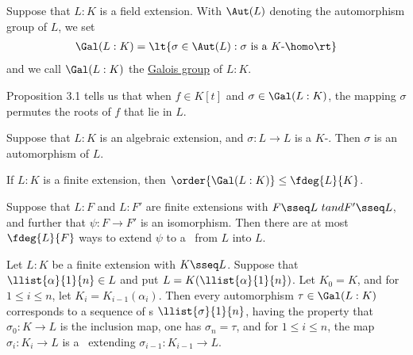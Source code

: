 \documentclass{article}
\begin{document}
  \begin{tdefinition}
    Suppose that \( L:K \) is a field extension.
    With \( \Aut(L) \) denoting the automorphism group of \( L \), we set \begin{align*}
      \Gal(L:K) = \lt\{ \sigma\in \Aut(L) : \sigma \text{ is a \( K \)-\homo} \rt\}
    \end{align*}
    and we call \( \Gal(L:K) \) the \ul{Galois group} of \( L:K \).
  \end{tdefinition}

  \quad Proposition 3.1 tells us that when \( f\in K[t] \) and \( \sigma\in \Gal(L:K) \), the mapping \( \sigma \) permutes the roots of \( f \) that lie in \( L \).

  \begin{ttheorem}
    Suppose that \( L:K \) is an algebraic extension, and \( \sigma:L\to L \) is a \( K \)-\homo.
    Then \( \sigma \) is an automorphism of \( L \).
  \end{ttheorem}

  \begin{ttheorem}
    If \( L:K \) is a finite extension, then \( \order{\Gal(L:K)}\leq \fdeg{L}{K} \).
  \end{ttheorem}

  \begin{tcorollary}
    Suppose that \( L:F \) and \( L:F' \) are finite extensions with \( F\sseq L\ tand F'\sseq L \), and further that \( \psi:F\to F' \) is an isomorphism.
    Then there are at most \( \fdeg{L}{F} \) ways to extend \( \psi \) to a \homo~from \( L \) into \( L \).
  \end{tcorollary}

  \begin{tcorollary}
    Let \( L:K \) be a finite extension with \( K\sseq L \).
    Suppose that \( \llist{\alpha}{1}{n}\in L \) and put \( L=K(\llist{\alpha}{1}{n}) \).
    Let \( K_0 = K \), and for \( 1\leq i\leq n \), let \( K_i = K_{i-1}(\alpha_i) \).
    Then every automorphism \( \tau \in \Gal(L:K) \) corresponds to a sequence of \homo s \( \llist{\sigma}{1}{n} \), having the property that \( \sigma_0:K\to L \) is the inclusion map, one has \( \sigma_n=\tau \), and for \( 1\leq i\leq n \), the map \( \sigma_i : K_i\to L \) is a \homo~extending \( \sigma_{i-1}:K_{i-1}\to L \).
  \end{tcorollary}
\end{document}
